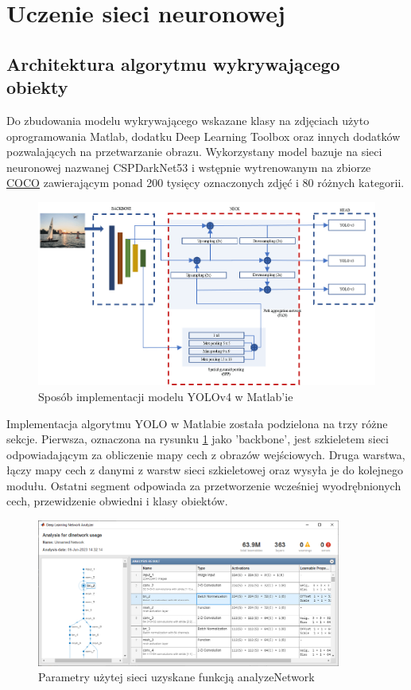 \section{Uczenie sieci neuronowej}
\subsection{Architektura algorytmu wykrywającego obiekty} \label{section:architekturaAlgorytmu}
Do zbudowania modelu wykrywającego wskazane klasy na zdjęciach użyto oprogramowania Matlab, dodatku
Deep Learning Toolbox oraz innych dodatków pozwalających na przetwarzanie obrazu. 
Wykorzystany model bazuje na sieci neuronowej nazwanej CSPDarkNet53 i wstępnie wytrenowanym na 
zbiorze \href{https://cocodataset.org/}{COCO} zawierającym ponad 200 tysięcy oznaczonych zdjęć i 80 różnych kategorii.
\begin{figure}[H]
	\centering
	\includegraphics[width=12cm]{pages/uczenie/img/yolov4architecture.png}
	\caption{Sposób implementacji modelu YOLOv4 w Matlab'ie \cite{matlabOYolov4}}
	\label{fig:implementacjaWMatlabie}
\end{figure}
Implementacja algorytmu YOLO w Matlabie została podzielona na trzy różne sekcje. 
Pierwsza, oznaczona na rysunku \ref{fig:implementacjaWMatlabie} jako 'backbone', jest szkieletem sieci odpowiadającym za obliczenie 
mapy cech z obrazów wejściowych. Druga warstwa, łączy mapy cech z danymi z warstw sieci szkieletowej oraz wysyła je do kolejnego modułu.
Ostatni segment odpowiada za przetworzenie wcześniej wyodrębnionych cech, przewidzenie obwiedni i klasy obiektów.
\begin{figure}[H]
	\centering
	\includegraphics[width=10cm]{pages/uczenie/img/wielkoscSieciMatlabAnalyze.png}
	\caption{Parametry użytej sieci uzyskane funkcją analyzeNetwork}
\end{figure}

